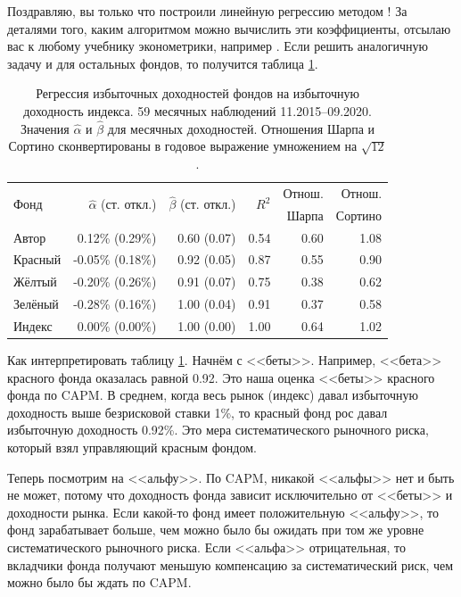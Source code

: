 Поздравляю, вы только что построили линейную регрессию методом ! За деталями того, каким алгоритмом можно вычислить эти коэффициенты, отсылаю вас к любому учебнику эконометрики, например \cite[ch.~2]{verbeek2012guide}. Если решить аналогичную задачу и для остальных фондов, то получится таблица \ref{capm_regression_results}.

\begin{table}[h]
\centering
\begin{tabular}{l|r|r|r|r|r}
\multirow{2}{*}{Фонд} & 
\multirow{2}{*}{$\hat{\alpha}$ (ст. откл.)} &
\multirow{2}{*}{$\hat{\beta}$ (ст. откл.)}  &
\multirow{2}{*}{$R^2$} &
Отнош.&
Отнош. \\
& & & & Шарпа & Сортино \\ \hline
Автор   &  0.12\% (0.29\%) & 0.60 (0.07) & 0.54 & 0.60 & 1.08 \\
Красный & -0.05\% (0.18\%) & 0.92 (0.05) & 0.87 & 0.55 & 0.90 \\
Жёлтый  & -0.20\% (0.26\%) & 0.91 (0.07) & 0.75 & 0.38 & 0.62 \\
Зелёный & -0.28\% (0.16\%) & 1.00 (0.04) & 0.91 & 0.37 & 0.58 \\ \hline
Индекс  &  0.00\% (0.00\%) & 1.00 (0.00) & 1.00 & 0.64 & 1.02
\end{tabular}
\caption{Регрессия избыточных доходностей фондов на избыточную доходность индекса. 59 месячных наблюдений 11.2015--09.2020. Значения $\hat{\alpha}$ и $\hat{\beta}$ для месячных доходностей. Отношения Шарпа и Сортино сконвертированы в годовое выражение умножением на $\sqrt{12}$.}
\label{capm_regression_results}
\end{table}

Как интерпретировать таблицу \ref{capm_regression_results}. Начнём с <<беты>>. Например, <<бета>> красного фонда оказалась равной 0.92. Это наша оценка <<беты>> красного фонда по CAPM. В среднем, когда весь рынок (индекс) давал избыточную доходность выше безрисковой ставки 1\%, то красный фонд рос давал избыточную доходность 0.92\%. Это мера систематического рыночного риска, который взял управляющий красным фондом.

Теперь посмотрим на <<альфу>>. По CAPM, никакой <<альфы>> нет и быть не может, потому что доходность фонда зависит исключительно от <<беты>> и доходности рынка. Если какой-то фонд имеет положительную <<альфу>>, то фонд зарабатывает больше, чем можно было бы ожидать при том же уровне систематического рыночного риска. Если <<альфа>> отрицательная, то вкладчики фонда получают меньшую компенсацию за систематический риск, чем можно было бы ждать по CAPM.

